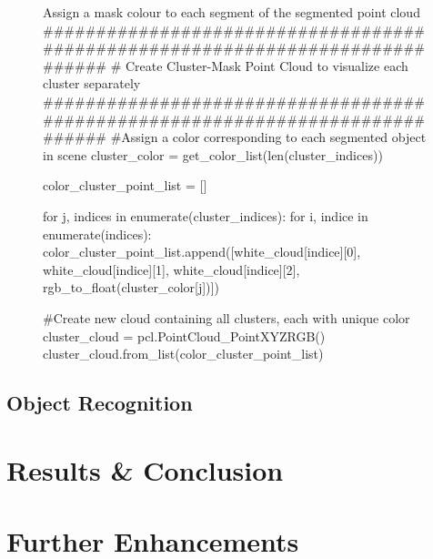 \documentclass[a4paper]{article}
\begin{document}
\begin{figure}[h]\scriptsize
\begin{sexylisting}{Assign a mask colour to each segment of the segmented point cloud}
##############################################################################
    # Create Cluster-Mask Point Cloud to visualize each cluster separately
##############################################################################
    #Assign a color corresponding to each segmented object in scene
    cluster_color = get_color_list(len(cluster_indices))

    color_cluster_point_list = []

    for j, indices in enumerate(cluster_indices):
        for i, indice in enumerate(indices):
            color_cluster_point_list.append([white_cloud[indice][0],
                                            white_cloud[indice][1],
                                            white_cloud[indice][2],
                                            rgb_to_float(cluster_color[j])])

    #Create new cloud containing all clusters, each with unique color
    cluster_cloud = pcl.PointCloud_PointXYZRGB()
    cluster_cloud.from_list(color_cluster_point_list)
\end{sexylisting}
\end{figure}

\subsection{Object Recognition}

\section{Results \& Conclusion}

\section{Further Enhancements}
\end{document}
